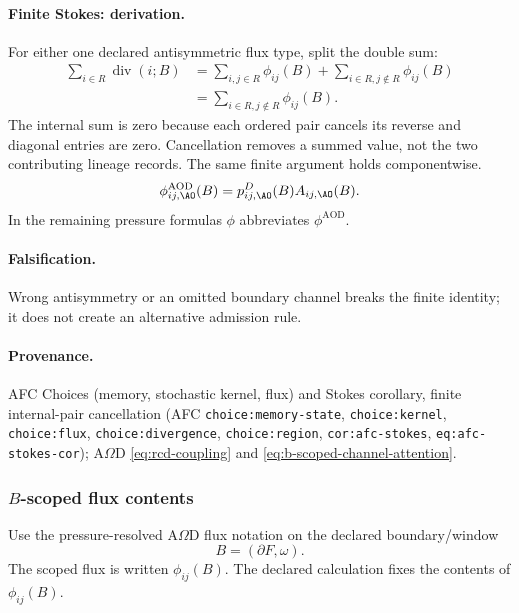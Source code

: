 \paragraph{Finite Stokes: derivation.}
For either one declared antisymmetric flux type, split the double sum:
\begin{equation}
\begin{split}
\sum_{i\in R}\operatorname{div}(i;B)
&=\sum_{i,j\in R}\phi_{ij}(B)+\sum_{i\in R,j\notin R}\phi_{ij}(B)\\
&=\sum_{i\in R,j\notin R}\phi_{ij}(B).
\end{split}
\label{eq:afc-stokes-used}
\end{equation}
The internal sum is zero because each ordered pair cancels its reverse and
diagonal entries are zero. Cancellation removes a summed value, not the
two contributing lineage records. The same finite argument holds componentwise.
\begin{equation}
\phi^{\mathrm{AOD}}_{ij,\AO}(B)=p^D_{ij,\AO}(B)A_{ij,\AO}(B).
\label{eq:afc-flux-ao-resolution}
\end{equation}
In the remaining pressure formulas \(\phi\) abbreviates \(\phi^{\mathrm{AOD}}\).
\paragraph{Falsification.} Wrong antisymmetry or an omitted boundary channel
breaks the finite identity; it does not create an alternative admission rule.
\paragraph{Provenance.} AFC Choices (memory, stochastic kernel, flux) and
Stokes corollary, finite internal-pair cancellation (AFC \texttt{choice:memory-state}, \texttt{choice:kernel}, \texttt{choice:flux}, \texttt{choice:divergence}, \texttt{choice:region}, \texttt{cor:afc-stokes}, \texttt{eq:afc-stokes-cor}); A\(\Omega\)D
\eqref{eq:rcd-coupling} and \eqref{eq:b-scoped-channel-attention}.
\subsubsection{\texorpdfstring{\(B\)-scoped flux contents}{B-scoped flux contents}}
\label{subsec:b-scoped-flux-contents}
Use the pressure-resolved A\(\Omega\)D flux notation on the declared boundary/window
\[
B=(\partial F,\omega).
\]
The scoped flux is written \(\phi_{ij}(B)\). The declared calculation fixes the contents of \(\phi_{ij}(B)\).

